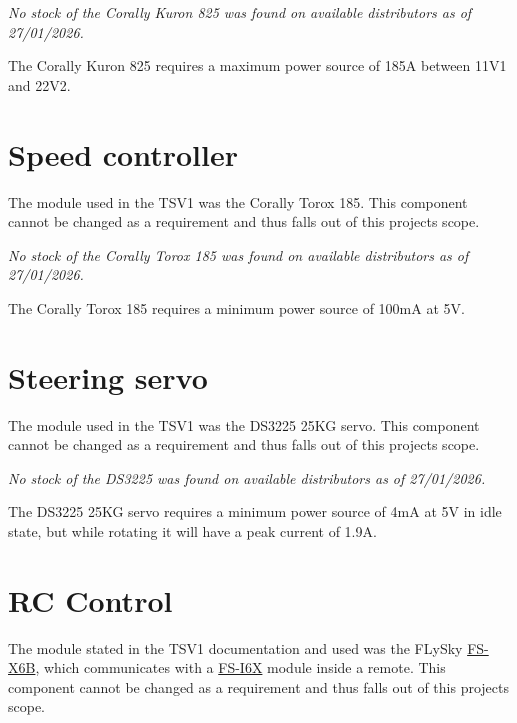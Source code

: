\documentclass[ti,oneside,10pt]{uantwerpenreport}
\begin{document}
\noindent\textit{No stock of the Corally Kuron 825 was found on available distributors as of 27/01/2026.}

The Corally Kuron 825 requires a maximum power source of 185A between 11V1 and 22V2.
\section{Speed controller}
\label{sec:ESC}
The module used in the TSV1 was the Corally Torox 185.
This component cannot be changed as a requirement and thus falls out of this projects scope.

\noindent\textit{No stock of the Corally Torox 185 was found on available distributors as of 27/01/2026.}

The Corally Torox 185 requires a minimum power source of 100mA at 5V.
\section{Steering servo}
\label{sec:SRV}
The module used in the TSV1 was the DS3225 25KG servo.
This component cannot be changed as a requirement and thus falls out of this projects scope.

\noindent\textit{No stock of the DS3225 was found on available distributors as of 27/01/2026.}

The DS3225 25KG servo requires a minimum power source of 4mA at 5V in idle state, but while rotating it will have a peak current of 1.9A.

\section{RC Control}  %
\label{sec:RCC}
The module stated in the TSV1 documentation and used was the FLySky \href{https://nl.aliexpress.com/item/1005006134316987.html?spm=a2g0o.productlist.main.15.95321a09nW14vW&algo_pvid=9092f028-b0a1-4945-84cc-a7fdfc72d3f0&algo_exp_id=9092f028-b0a1-4945-84cc-a7fdfc72d3f0-7&pdp_npi=4%40dis%21EUR%2141.97%2112.59%21%21%21312.28%2193.68%21%40211b813f17342694926984392e2043%2112000035914037103%21sea%21BE%21723903832%21X&curPageLogUid=dxkHTjTdY4Ll&utparam-url=scene%3Asearch%7Cquery_from%3A}{FS-X6B}, which communicates with a \href{https://nl.aliexpress.com/item/1005006860791905.html?spm=a2g0o.productlist.main.11.95321a09nW14vW&algo_pvid=9092f028-b0a1-4945-84cc-a7fdfc72d3f0&algo_exp_id=9092f028-b0a1-4945-84cc-a7fdfc72d3f0-5&pdp_npi=4%40dis%21EUR%2188.64%2139.89%21%21%21659.52%21296.80%21%40211b813f17342694926984392e2043%2112000044069229511%21sea%21BE%21723903832%21X&curPageLogUid=EwOXjJz6C5DD&utparam-url=scene%3Asearch%7Cquery_from%3A}{FS-I6X} module inside a remote.
This component cannot be changed as a requirement and thus falls out of this projects scope.
\end{document}
